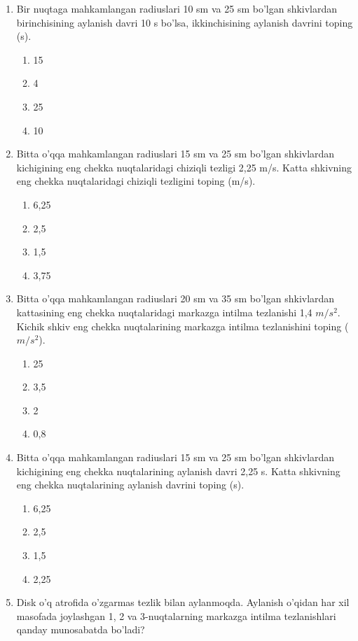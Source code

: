 \begin{enumerate}
\item Bir nuqtaga mahkamlangan radiuslari 10 sm va 25 sm bo'lgan shkivlardan birinchisining aylanish davri 10 s bo'lsa, ikkinchisining aylanish davrini toping (s).
\begin{enumerate}[label=\Alph*)]
\item 15
\item 4
\item 25
\item 10
\end{enumerate}

\item Bitta o'qqa mahkamlangan radiuslari 15 sm va 25 sm bo'lgan shkivlardan kichigining eng chekka nuqtalaridagi chiziqli tezligi 2,25 m/s. Katta shkivning eng chekka nuqtalaridagi chiziqli tezligini toping (m/s).
\begin{enumerate}[label=\Alph*)]
\item 6,25
\item 2,5
\item 1,5
\item 3,75
\end{enumerate}

\item Bitta o'qqa mahkamlangan radiuslari 20 sm va 35 sm bo'lgan shkivlardan kattasining eng chekka nuqtalaridagi markazga intilma tezlanishi 1,4 $m/s^2$. Kichik shkiv eng chekka nuqtalarining markazga intilma tezlanishini toping ($m/s^2$).
\begin{enumerate}[label=\Alph*)]
\item 25
\item 3,5
\item 2
\item 0,8
\end{enumerate}

\item Bitta o'qqa mahkamlangan radiuslari 15 sm va 25 sm bo'lgan shkivlardan kichigining eng chekka nuqtalarining aylanish davri 2,25 s. Katta shkivning eng chekka nuqtalarining aylanish davrini toping (s).
\begin{enumerate}[label=\Alph*)]
\item 6,25
\item 2,5
\item 1,5
\item 2,25
\end{enumerate}

\item Disk o'q atrofida o'zgarmas tezlik bilan aylanmoqda. Aylanish o'qidan har xil masofada joylashgan 1, 2 va 3-nuqtalarning markazga intilma tezlanishlari qanday munosabatda bo'ladi?


\end{enumerate}
